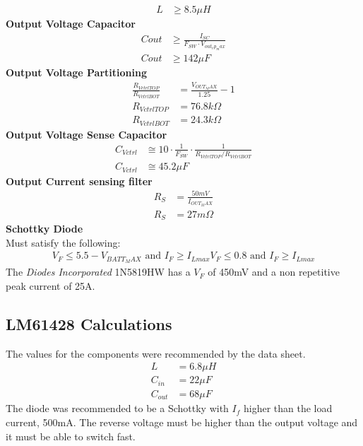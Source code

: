 \documentclass{article}
\numberwithin{figure}{section}
\numberwithin{equation}{section}
\begin{document}
{\begin{align}
  L&\geq 8.5 \mu H
\end{align}
\textbf{Output Voltage Capacitor}
\begin{align}
  \label{eq:outcap}
  Cout &\geq \frac{I_{SC}}{F_{SW}\cdot V_{out_rp_max}} \\
  Cout &\geq 142\mu F
\end{align}
\textbf{Output Voltage Partitioning}
\begin{align}
  \label{eq:outputvpart}
  \frac{R_{VctrlTOP}}{R_{VctrlBOT}} &= \frac{V_{OUT_MAX}}{1.25}-1 \\
  R_{VctrlTOP} &= 76.8k\Omega \\
  R_{VctrlBOT} &= 24.3k\Omega
\end{align}
\textbf{Output Voltage Sense Capacitor}
\begin{align}
  \label{eq:outsensecap}
  C_{Vctrl} &\cong 10\cdot \frac{1}{F_{SW}}\cdot \frac{1}{R_{VctrlTOP}/R_{VctrlBOT}} \\
  C_{Vctrl} &\cong 45.2 \mu F
\end{align}
\textbf{Output Current sensing filter}
\begin{align}
  \label{eq:currentsense}
  R_{S}&= \frac{50mV}{I_{OUT_MAX}} \\
  R_{S}&= 27m\Omega
\end{align}
\textbf{Schottky Diode} \\
Must satisfy the following:
\begin{align*}
  V_F \leq 5.5-V_{BATT_MAX} \mbox{ and } I_F \geq I_{Lmax}
  V_F \leq 0.8 \mbox{ and } I_F \geq I_{Lmax}
\end{align*}
The \textit{Diodes Incorporated }1N5819HW has a $V_F$ of 450mV and a non repetitive peak current of 25A.

\subsection{LM61428 Calculations} \label{app:lm61calcs}
The values for the components were recommended by the data sheet.
\begin{align*}
  L &= 6.8\mu H \\
  C_{in} &= 22\mu F \\
  C_{out} &= 68\mu F
\end{align*}
The diode was recommended to be a Schottky with $I_f$ higher than the load current, 500mA. The reverse voltage must be higher than the output voltage and it must be able to switch fast. 

\newpage
}
\end{document}
